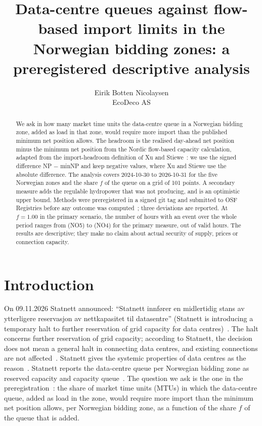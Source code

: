 


\title{Data-centre queues against flow-based import limits in the Norwegian bidding zones: a preregistered descriptive analysis}
\author{Eirik Botten Nicolaysen\\EcoDeco AS}
\date{}
\maketitle

\begin{abstract}
\noindent
We ask in how many market time units the data-centre queue in a Norwegian bidding zone, added as load in that zone, would require more import than the published minimum net position allows. %
The headroom is the realised day-ahead net position minus the minimum net position from the Nordic flow-based capacity calculation, adapted from the import-headroom definition of Xu and Stiewe~\cite{xu}: we use the signed difference NP $-$ minNP and keep negative values, where Xu and Stiewe use the absolute difference. %
The analysis covers 2024-10-30 to 2026-10-31 for the five Norwegian zones and the share $f$ of the queue on a grid of 101 points. %
A secondary measure adds the regulable hydropower that was not producing, and is an optimistic upper bound. %
Methods were preregistered in a signed git tag and submitted to OSF Registries before any outcome was computed~\cite{osf}; three deviations are reported. %
At $f = 1.00$ in the primary scenario, the number of hours with an event over the whole period ranges from \resPrimFullNOfive{} (NO5) to \resPrimFullNOfour{} (NO4) for the primary measure, out of \resGyldigeTimerPrimaer{} valid hours. %
The results are descriptive; they make no claim about actual security of supply, prices or connection capacity.
\end{abstract}

\section{Introduction}
\label{sec:intro}

On 09.11.2026 Statnett announced: ``Statnett innfører en midlertidig stans av ytterligere reservasjon av nettkapasitet til datasentre'' (Statnett is introducing a temporary halt to further reservation of grid capacity for data centres)~\cite{press}. %
The halt concerns further reservation of grid capacity; according to Statnett, the decision does not mean a general halt in connecting data centres, and existing connections are not affected~\cite{press}. Statnett gives the systemic properties of data centres as the reason~\cite{press}. %
Statnett reports the data-centre queue per Norwegian bidding zone as reserved capacity and capacity queue~\cite{pbi}. %
The question we ask is the one in the preregistration~\cite{osf}: the share of market time units (MTUs) in which the data-centre queue, added as load in the zone, would require more import than the minimum net position allows, per Norwegian bidding zone, as a function of the share $f$ of the queue that is added. %

